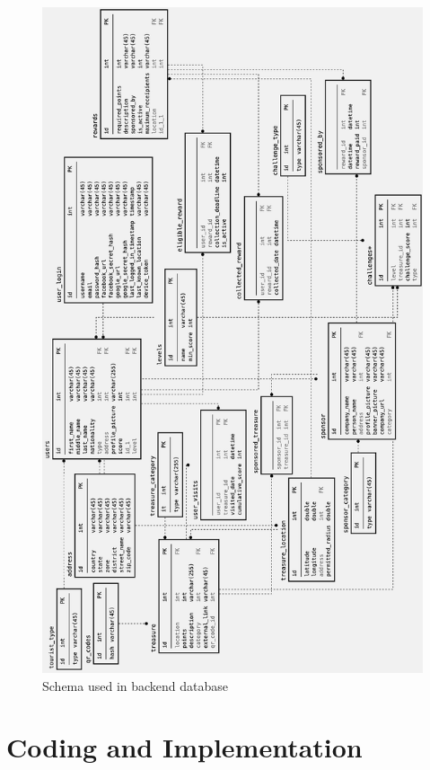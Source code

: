 \documentclass[12pt, a4paper, oneside]{article}
\begin{document}
\begin{figure}[H]
\includegraphics[height=0.8\paperheight, keepaspectratio]{db/schema.png}
\centering
\caption{Schema used in backend database}
\label{fig:db-schema}
\end{figure}


\pagebreak
\section{Coding and Implementation}
\end{document}
